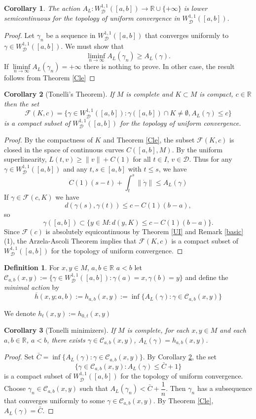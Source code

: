 \documentclass[12pt]{amsart}
\theoremstyle{plain}
\newtheorem{corollary}{Corollary}
\theoremstyle{definition}
\newtheorem{definition}{Definition}
\newcommand{\R}{\mathbb R}
\newcommand{\cC}{\mathcal C}
\newcommand{\cD}{\mathcal D}
\newcommand{\cW}{W^{1,1}}
\newcommand{\cWD}{\cW_\cD}
\newcommand{\cF}{\mathcal F}
\newcommand{\bh}{\overline{h}}
\newcommand{\ga}{\gamma}
\newcommand{\dga}{\dot\gamma}
\begin{document}
\begin{corollary}\label{low-semi}
  The action
  $A_L:\cWD([a,b])\to \R\cup\{+\infty\}$ is lower semicontinuous
  for the topology of uniform convergence in $\cWD([a,b])$.
\end{corollary}
\begin{proof}
  Let $\ga_n$ be a sequence in $\cWD([a,b])$ that converges
  uniformly to $\ga\in \cWD([a,b])$. We must show that
  \[\liminf_{n\to\infty}A_L(\ga_n)\ge A_L(\ga).\]
If $\liminf\limits_{n\to\infty}A_L(\ga_n)=+\infty$ there is nothing to prove.
In other case, the result follows from Theorem \ref{Cle}
\end{proof}


\begin{corollary}[Tonelli's Theorem]\label{tonelli}
  If $M$ is complete and $K\subset M$ is compact, $c\in\R$
  then the set 
\[\cF(K,c)=\{\ga\in\cWD([a,b]): \ga([a,b])\cap K\ne\emptyset,
A_L(\ga)\le c\}\]
is a compact subset of $\cWD([a,b])$ for the topology of
uniform convergence.
\end{corollary}
\begin{proof}
By the compactness of $K$ and Theorem \ref{Cle}, the subset
  $\cF(K,c)$ is closed in the space of continuous curves $C([a,b],M)$.
  By the uniform superlinearity,
  $L(t,v)\ge\|v\|+C(1)$ for all $t\in I$, $v\in\cD$. Thus
  for any $\ga\in\cWD([a,b])$ and any $t,s\in[a,b]$ with $t\le s$, we have 
 \[C(1)(s-t)+\int_t^s\|\dga\|\le A_L(\ga)\]
If $\ga\in\cF(c,K)$ we have
\[d(\ga(s),\ga(t))\le c-C(1)(b-a) ,\]
so
\[\ga([a,b])\subset\{y\in M:d(y,K)\le c-C(1)(b-a) \}.\]
Since $\cF(c)$ is absolutely equicontinuous by  Theorem \ref{UI} and
Remark \ref{basic} (1),
the Arzela-Ascoli Theorem implies that $\cF(K,c)$ is a compact subset
of $\cWD([a,b])$ for the topology of uniform convergence.
\end{proof}
\begin{definition} For $x,y\in M$, $a,b\in\R$ $a<b$
let $\cC_{a,b}(x,y):=\{\ga\in\cWD([a,b]): \ga(a)=x, \ga(b)=y\}$
and define the  {\em minimal action} by
  \[\bh(x,y;a,b):=h_{a,b}(x,y):=\inf\{A_L(\ga):\ga\in\cC_{a,b}(x,y)\}\]
\end{definition}
We denote $h_t(x,y):=h_{0,t}(x,y)$
\begin{corollary}[Tonelli minimizers]\label{ton-min}
    If $M$ is complete, for each $x,y\in M$ 
 and each $a,b\in\R$, $a<b$, there exists $\ga\in\cC_{a,b}(x,y)$,
 $A_L(\ga) =h_{a,b}(x,y)$.
\end{corollary}
\begin{proof}
  Set $\bar C=\inf\{A_L(\ga):\ga\in\cC_{a,b}(x,y)\}$.
  By Corollary \ref{tonelli}, the set 
\[\{\ga\in\cC_{a,b}(x,y):A_L(\ga)\le\bar C+1\}\]
is a compact subset of $\cWD([a,b])$ for the topology of
uniform convergence.
Choose $\ga_n\in\cC_{a,b}(x,y)$ such that $A_L(\ga_n)<\bar C+\dfrac 1n$.
Then $\ga_n$ has a subsequence that converges uniformly
to some $\ga\in \cC_{a,b}(x,y)$. By Theorem \ref{Cle}, $A_L(\ga)=\bar C$. 
\end{proof}
\end{document}
